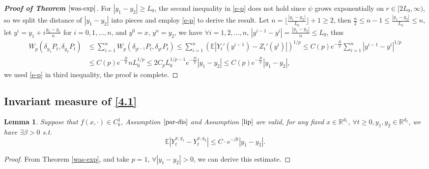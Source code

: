 \documentclass[11pt,reqno]{amsart}
\newtheorem{lemma}{\indent Lemma}[section]
\numberwithin{equation}{section}
\begin{document}
\begin{proof}[\textbf{Proof of Theorem $\ref{was-exp}$}]
For $|y_1-y_2|\geq L_0$, the second inequality in \eqref{e-p} does not hold since $\psi$ grows exponentially on $r\in[2L_0,\infty)$, so we split the distance of $|y_1-y_2|$ into pieces and employ \eqref{e-p} to derive the result.  Let $n=\lfloor\frac{|y_1-y_2|}{L_0}\rfloor+ 1\geq2$, then
$\frac{n}{2}\le n-1\leq\frac{|y_1-y_2|}{L_0}\leq n,$
let $y^i=y_1+i\frac{y_2-y_1}{n}$ for $i=0,1,\ldots, n$, and $y^0=x$, $y^n=y_2$, we have $\forall i=1,2,\ldots,n$, $|y^{i-1}-y^{i}|=\frac{|y_1-y_2|}{n}\le L_0$,
thus 
\begin{align}\label{e-p-2}
W_p(\delta_{y_1}P_t,\delta_{y_2}P_t)&\leq \sum_{i=1}^n
W_{p}(\delta _{y^{i-1}} P_t,\delta_{y^{i}}P_t)\leq\sum_{i=1}^n(\mathbb{E}|Y_t'(y^{i-1})-Z_t'(y^{i})|)^{1/p} \leq C(p) e^{-\frac{\beta t}{p}}\sum_{i=1}^n|y^{i-1}-y^{i}|^{1/p}\nonumber\\
&\leq C(p)e^{-\frac{\beta t}{p}} nL_0^{1/p}\leq 2C_pL_0^{1/p-1}e^{-\frac{\beta t}{p}}|y_1-y_2|\leq C(p)e^{-\frac{\beta t}{p}}|y_1-y_2|,
\end{align}
we used \eqref{e-p} in third inequality, the proof is complete.
\end{proof}





\subsection{Invariant measure of \ref{4.1}}\label{inv-gen}
\begin{lemma}\label{L-inv-gen}
	Suppose that $ f(x,\cdot)\in C^{1}_{b}$,  Assumption $\ref{par-dis}$ and  Assumption $\ref{lip}$ are valid, for any fixed  $ x\in \mathbb{R}^{d_{1}}$, $\forall  t\geq0, y_{1}, y_{2}\in \mathbb{R}^{d_{2}}$, we have $\exists \beta>0$ s.t.
	$$ 	\mathbb{E}| Y_{t}^{ x, y_{1}}-Y_{t}^{x, y_{2}}|\leq C\cdot e^{-\beta t}| y_{1}- y_{2}|.$$
\end{lemma}
\begin{proof}
From %
Theorem \ref{was-exp}, and take $p=1$, $\forall |y_{1}- y_{2}|>0$, we can derive this estimate.
\end{proof}
\end{document}

